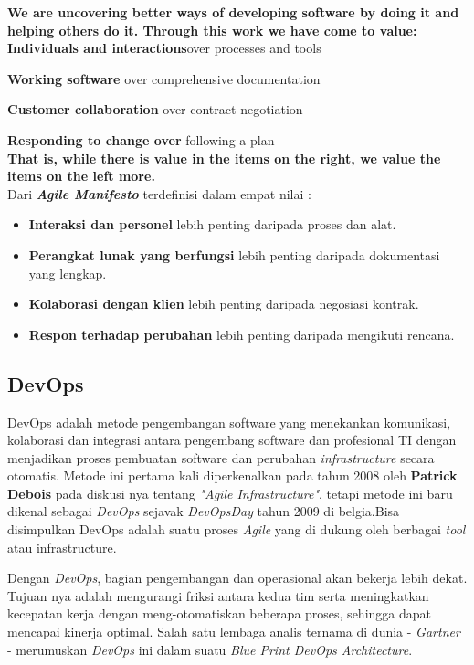 \documentclass[9pt,twocolumn,twoside]{Gunadarma}
\begin{document}
\textbf{We are uncovering better ways of developing
software by doing it and helping others do it.
Through this work we have come to value:}
\\

\textbf{\Large{Individuals and interactions}}over processes and tools

\textbf{\Large{Working software}} over comprehensive documentation

\textbf{\Large{Customer collaboration}} over contract negotiation

\textbf{\Large{Responding to change over}} following a plan
\\

\textbf{That is, while there is value in the items on
the right, we value the items on the left more.}
\\

Dari \textbf{\textit{Agile Manifesto}} terdefinisi dalam empat nilai :
\begin{itemize}
\item \textbf{Interaksi dan personel} lebih penting daripada proses dan alat.
\item \textbf{Perangkat lunak yang berfungsi} lebih penting daripada dokumentasi yang lengkap.
\item \textbf{Kolaborasi dengan klien} lebih penting daripada negosiasi kontrak.
\item \textbf{Respon terhadap perubahan} lebih penting daripada mengikuti rencana.
\end{itemize}




\subsection{DevOps}
DevOps adalah metode pengembangan software yang menekankan komunikasi, kolaborasi dan integrasi antara pengembang software dan profesional TI dengan menjadikan proses pembuatan software dan perubahan \textit{infrastructure} secara otomatis. Metode ini pertama kali diperkenalkan pada tahun 2008 oleh \textbf{Patrick Debois} pada diskusi nya tentang \textit{"Agile Infrastructure"}, tetapi metode ini baru dikenal sebagai \textit{DevOps} sejavak \textit{DevOpsDay} tahun 2009 di belgia.Bisa disimpulkan DevOps adalah suatu proses \textit{Agile} yang di dukung oleh berbagai \textit{tool} atau infrastructure. 

Dengan \textit{DevOps}, bagian pengembangan dan operasional akan bekerja lebih dekat. Tujuan nya adalah mengurangi friksi antara kedua tim serta meningkatkan kecepatan kerja dengan meng-otomatiskan beberapa proses, sehingga dapat mencapai kinerja optimal. Salah satu lembaga analis ternama di dunia - \textit{Gartner} - merumuskan \textit{DevOps} ini dalam suatu \textit{Blue Print DevOps Architecture}\cite{DevOps:02}.
\\ \\ 
\end{document}
